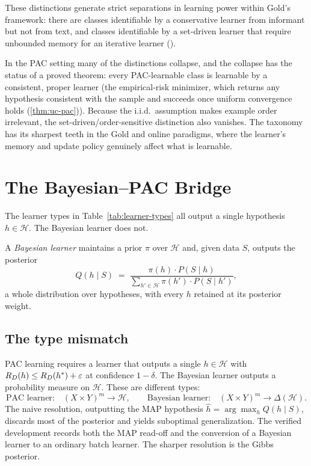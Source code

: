 These distinctions generate strict separations in learning power within Gold's framework: there are classes identifiable by a conservative learner from informant but not from text, and classes identifiable by a set-driven learner that require unbounded memory for an iterative learner ().

In the PAC setting many of the distinctions collapse, and the collapse has the status of a proved theorem: every PAC-learnable class is learnable by a consistent, proper learner (the empirical-risk minimizer, which returns any hypothesis consistent with the sample and succeeds once uniform convergence holds (\cref{thm:uc-pac})). Because the i.i.d.\ assumption makes example order irrelevant, the set-driven/order-sensitive distinction also vanishes. The taxonomy has its sharpest teeth in the Gold and online paradigms, where the learner's memory and update policy genuinely affect what is learnable.


\section{The Bayesian--PAC Bridge}
\label{sec:bayesian-pac}

The learner types in Table~\ref{tab:learner-types} all output a single hypothesis $h \in \mathcal{H}$. The Bayesian learner does not.

\begin{defn}
\label{def:bayesian-learner}
A \emph{Bayesian learner} maintains a prior $\pi$ over $\mathcal{H}$ and, given data $S$, outputs the posterior
\[
Q(h \mid S) \;=\; \frac{\pi(h) \cdot P(S \mid h)}{\sum_{h' \in \mathcal{H}} \pi(h') \cdot P(S \mid h')},
\]
a whole distribution over hypotheses, with every $h$ retained at its posterior weight.
\end{defn}

\subsection{The type mismatch}

PAC learning requires a learner that outputs a single $h \in \mathcal{H}$ with $R_D(h) \leq R_D(h^\ast) + \varepsilon$ at confidence $1 - \delta$. The Bayesian learner outputs a probability measure on $\mathcal{H}$. These are different types:
\[
\text{PAC learner:} \quad (X \times Y)^m \to \mathcal{H},
\qquad
\text{Bayesian learner:} \quad (X \times Y)^m \to \Delta(\mathcal{H}).
\]
The naive resolution, outputting the MAP hypothesis $\hat{h} = \arg\max_h Q(h \mid S)$, discards most of the posterior and yields suboptimal generalization. The verified development records both the MAP read-off and the conversion of a Bayesian learner to an ordinary batch learner. The sharper resolution is the Gibbs posterior.

